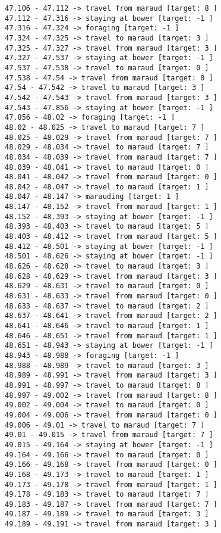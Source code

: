 \documentclass[11pt]{article}
\begin{document}
\begin{Verbatim}[commandchars=\\\{\}]
47.106 - 47.112 -> travel from maraud [target: 8 ]
47.112 - 47.316 -> staying at bower [target: -1 ]
47.316 - 47.324 -> foraging [target: -1 ]
47.324 - 47.325 -> travel to maraud [target: 3 ]
47.325 - 47.327 -> travel from maraud [target: 3 ]
47.327 - 47.537 -> staying at bower [target: -1 ]
47.537 - 47.538 -> travel to maraud [target: 0 ]
47.538 - 47.54 -> travel from maraud [target: 0 ]
47.54 - 47.542 -> travel to maraud [target: 3 ]
47.542 - 47.543 -> travel from maraud [target: 3 ]
47.543 - 47.856 -> staying at bower [target: -1 ]
47.856 - 48.02 -> foraging [target: -1 ]
48.02 - 48.025 -> travel to maraud [target: 7 ]
48.025 - 48.029 -> travel from maraud [target: 7 ]
48.029 - 48.034 -> travel to maraud [target: 7 ]
48.034 - 48.039 -> travel from maraud [target: 7 ]
48.039 - 48.041 -> travel to maraud [target: 0 ]
48.041 - 48.042 -> travel from maraud [target: 0 ]
48.042 - 48.047 -> travel to maraud [target: 1 ]
48.047 - 48.147 -> marauding [target: 1 ]
48.147 - 48.152 -> travel from maraud [target: 1 ]
48.152 - 48.393 -> staying at bower [target: -1 ]
48.393 - 48.403 -> travel to maraud [target: 5 ]
48.403 - 48.412 -> travel from maraud [target: 5 ]
48.412 - 48.501 -> staying at bower [target: -1 ]
48.501 - 48.626 -> staying at bower [target: -1 ]
48.626 - 48.628 -> travel to maraud [target: 3 ]
48.628 - 48.629 -> travel from maraud [target: 3 ]
48.629 - 48.631 -> travel to maraud [target: 0 ]
48.631 - 48.633 -> travel from maraud [target: 0 ]
48.633 - 48.637 -> travel to maraud [target: 2 ]
48.637 - 48.641 -> travel from maraud [target: 2 ]
48.641 - 48.646 -> travel to maraud [target: 1 ]
48.646 - 48.651 -> travel from maraud [target: 1 ]
48.651 - 48.943 -> staying at bower [target: -1 ]
48.943 - 48.988 -> foraging [target: -1 ]
48.988 - 48.989 -> travel to maraud [target: 3 ]
48.989 - 48.991 -> travel from maraud [target: 3 ]
48.991 - 48.997 -> travel to maraud [target: 8 ]
48.997 - 49.002 -> travel from maraud [target: 8 ]
49.002 - 49.004 -> travel to maraud [target: 0 ]
49.004 - 49.006 -> travel from maraud [target: 0 ]
49.006 - 49.01 -> travel to maraud [target: 7 ]
49.01 - 49.015 -> travel from maraud [target: 7 ]
49.015 - 49.164 -> staying at bower [target: -1 ]
49.164 - 49.166 -> travel to maraud [target: 0 ]
49.166 - 49.168 -> travel from maraud [target: 0 ]
49.168 - 49.173 -> travel to maraud [target: 1 ]
49.173 - 49.178 -> travel from maraud [target: 1 ]
49.178 - 49.183 -> travel to maraud [target: 7 ]
49.183 - 49.187 -> travel from maraud [target: 7 ]
49.187 - 49.189 -> travel to maraud [target: 3 ]
49.189 - 49.191 -> travel from maraud [target: 3 ]

\end{Verbatim}
\end{document}
